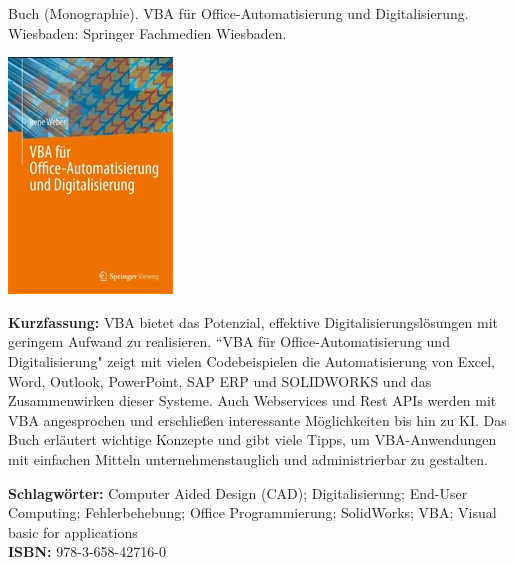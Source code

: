 {
Buch (Monographie). VBA für Office-Automatisierung und Digitalisierung.
Wiesbaden: Springer Fachmedien Wiesbaden.
 \\
\begin{minipage}{0.38\textwidth}
	\includegraphics[width=\linewidth]{images/Weber.jpg}
\end{minipage}
\hfill
\begin{minipage}{0.6\textwidth}
\textbf{Kurzfassung:}
VBA bietet das Potenzial, effektive Digitalisierungslösungen mit geringem Aufwand zu realisieren. “VBA für Office-Automatisierung und Digitalisierung" zeigt mit vielen Codebeispielen die Automatisierung von Excel, Word, Outlook, PowerPoint, SAP ERP und SOLIDWORKS und das Zusammenwirken dieser Systeme. Auch Webservices und Rest APIs werden mit VBA angesprochen und erschließen interessante Möglichkeiten bis hin zu KI. Das Buch erläutert wichtige Konzepte und gibt viele Tipps, um VBA-Anwendungen mit einfachen Mitteln unternehmenstauglich und administrierbar zu gestalten.
\end{minipage}
\textbf{Schlagwörter:}
Computer Aided Design (CAD); Digitalisierung; End-User Computing; Fehlerbehebung; Office Programmierung; SolidWorks; VBA; Visual basic for applications
\\ \textbf{ISBN:}
978-3-658-42716-0
}
